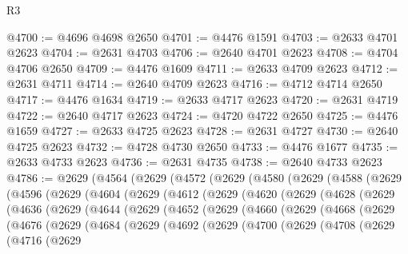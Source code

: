 \begin{lexlean}{R3}
\begin{coremodule}
@4700 := @4696 @4698 @2650
@4701 := @4476 @1591
@4703 := @2633 @4701 @2623
@4704 := @2631 @4703
@4706 := @2640 @4701 @2623
@4708 := @4704 @4706 @2650
@4709 := @4476 @1609
@4711 := @2633 @4709 @2623
@4712 := @2631 @4711
@4714 := @2640 @4709 @2623
@4716 := @4712 @4714 @2650
@4717 := @4476 @1634
@4719 := @2633 @4717 @2623
@4720 := @2631 @4719
@4722 := @2640 @4717 @2623
@4724 := @4720 @4722 @2650
@4725 := @4476 @1659
@4727 := @2633 @4725 @2623
@4728 := @2631 @4727
@4730 := @2640 @4725 @2623
@4732 := @4728 @4730 @2650
@4733 := @4476 @1677
@4735 := @2633 @4733 @2623
@4736 := @2631 @4735
@4738 := @2640 @4733 @2623
@4786 := @2629
    (@4564
      (@2629
        (@4572
          (@2629
            (@4580
              (@2629
                (@4588
                  (@2629
                    (@4596
                      (@2629
                        (@4604
                          (@2629
                            (@4612
                              (@2629
                                (@4620
                                  (@2629
                                    (@4628
                                      (@2629
                                        (@4636
                                          (@2629
                                            (@4644
                                              (@2629
                                                (@4652
                                                  (@2629
                                                    (@4660
                                                      (@2629
                                                        (@4668
                                                          (@2629
                                                            (@4676
                                                              (@2629
                                                                (@4684
                                                                  (@2629
                                                                    (@4692
                                                                      (@2629
                                                                        (@4700
                                                                          (@2629
                                                                            (@4708
                                                                              (@2629
                                                                                (@4716
                                                                                  (@2629

\end{coremodule}
\end{lexlean}
